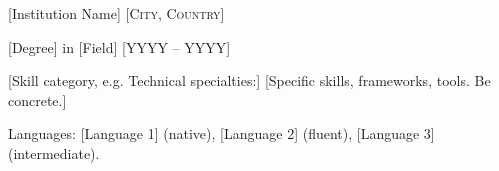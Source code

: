 \documentclass[10pt,a4paper]{article}
\begin{document}
\spacedhrule{-0.2em}{-0.4em}



\headedsection
{[Institution Name]}
{\textsc{[City, Country]}} {

\headedsubsection
{[Degree] in [Field]}
{[YYYY -- YYYY]}
{}
}

\spacedhrule{0.5em}{-0.4em}



\inlineheadsection
{[Skill category, e.g. Technical specialties:]}
{[Specific skills, frameworks, tools. Be concrete.]}


\inlineheadsection
{Languages:}
{[Language 1] (native), [Language 2] (fluent), [Language 3] (intermediate).}
\end{document}
